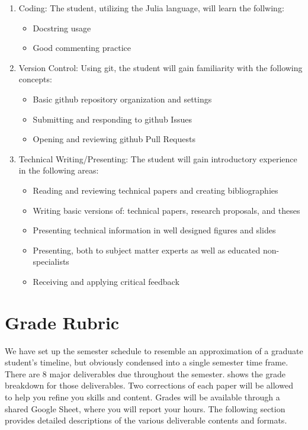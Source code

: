 \documentclass[12pt]{article}
\begin{document}
\begin{enumerate}
	\item Coding: The student, utilizing the Julia language, will learn the follwing:
	\begin{itemize}
		\item Docstring usage
		\item Good commenting practice
	\end{itemize}
	\item Version Control: Using git, the student will gain familiarity with the following concepts:
	\begin{itemize}
		\item Basic github repository organization and settings
		\item Submitting and responding to github Issues
		\item Opening and reviewing github Pull Requests
	\end{itemize}
	\item Technical Writing/Presenting: The student will gain introductory experience in the following areas:
	\begin{itemize}
		\item Reading and reviewing technical papers and creating bibliographies
		\item Writing basic versions of: technical papers, research proposals, and theses
		\item Presenting technical information in well designed figures and slides
		\item Presenting, both to subject matter experts as well as educated non-specialists
		\item Receiving and applying critical feedback
	\end{itemize}
\end{enumerate}





\section{Grade Rubric}
\label{sec:graderubric}

We have set up the semester schedule to resemble an approximation of a graduate student's timeline, but obviously condensed into a single semester time frame.
There are 8 major deliverables due throughout the semester.
 shows the grade breakdown for those deliverables.
Two corrections of each paper will be allowed to help you refine you skills and content.
Grades will be available through a shared Google Sheet, where you will report your hours. 
The following section provides detailed descriptions of the various deliverable contents and formats.
\end{document}
